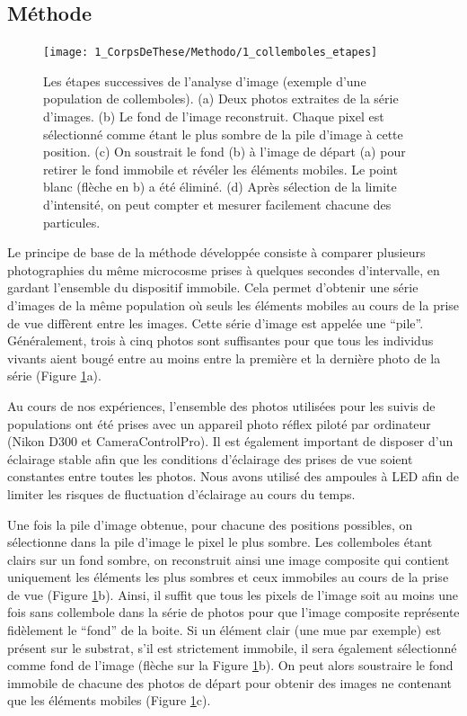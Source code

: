 \subsection{Méthode}

\begin{figure}[!ht]
\begin{center}
\texttt{[image: 1\_CorpsDeThese/Methodo/1\_collemboles\_etapes]}
\caption[ Les étapes
de l'analyse d'image]{Les étapes successives de l'analyse d'image (exemple
d'une population de collemboles).
(a) Deux photos extraites de la série d'images. (b) Le fond de l'image
reconstruit. Chaque pixel est sélectionné comme étant le plus sombre de la
pile d'image à cette position. (c) On soustrait le fond (b) à l'image de départ
(a) pour retirer le fond immobile et révéler les éléments mobiles. Le point blanc
(flèche en b) a été éliminé. (d) Après sélection de la limite d'intensité, on
peut compter et mesurer facilement chacune des particules.}
\label{fig:photoetapes}
\end{center}
\end{figure}



Le principe de base de la méthode développée consiste à comparer plusieurs
photographies du même microcosme prises à quelques secondes d'intervalle, en
gardant l'ensemble du dispositif immobile. Cela permet d'obtenir une série
d'images de la même population où seuls les éléments mobiles au cours de la
prise de vue diffèrent entre les images. Cette série d'image est appelée une
``pile''.
Généralement, trois à cinq photos sont suffisantes pour que tous les individus
vivants aient bougé entre au moins entre la première et la dernière photo de la
série (Figure \ref{fig:photoetapes}a).

Au cours de nos expériences, l'ensemble des photos utilisées pour les suivis
de populations ont été prises avec un appareil photo réflex piloté par
ordinateur (Nikon D300 et CameraControlPro\textcopyright). Il est également important de disposer d'un
éclairage stable afin que les conditions d'éclairage des prises de vue soient
constantes entre toutes les photos. Nous avons utilisé des ampoules à LED afin
de limiter les risques de fluctuation d'éclairage au cours du temps. 

Une fois la pile d'image obtenue, pour chacune des positions possibles, on
sélectionne dans la pile d'image le pixel le plus sombre. Les collemboles
étant clairs sur un fond sombre, on reconstruit ainsi une image composite qui
contient uniquement les éléments les plus sombres et ceux immobiles au cours de
la prise de vue (Figure \ref{fig:photoetapes}b).
Ainsi, il suffit que tous les pixels de l'image soit au moins une fois sans collembole
dans la série de photos pour que l'image composite représente fidèlement le
``fond'' de la boite. Si un élément clair (une mue par exemple) est présent sur
le substrat, s'il est strictement immobile, il sera également sélectionné comme
fond de l'image (flèche sur la Figure \ref{fig:photoetapes}b). 
On peut alors soustraire le fond immobile de chacune des photos de départ pour
obtenir des images ne contenant que les éléments mobiles (Figure
\ref{fig:photoetapes}c). 


